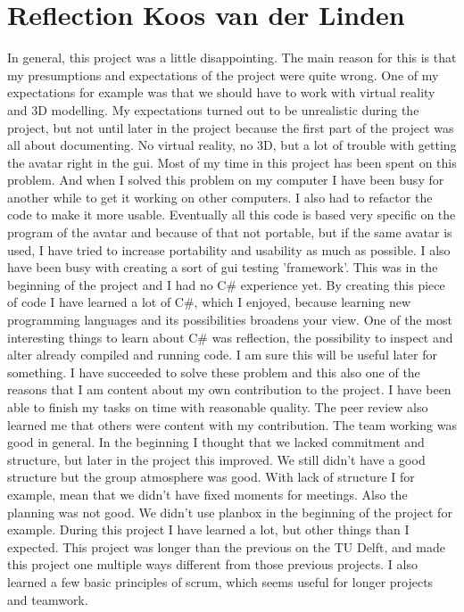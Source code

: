 \section{Reflection Koos van der Linden}
In general, this project was a little disappointing. The main reason for this is that my presumptions and expectations of the project were quite wrong. One of my expectations for example was that we should have to work with virtual reality and 3D modelling. My expectations turned out to be unrealistic during the project, but not until later in the project because the first part of the project was all about documenting. 
No virtual reality, no 3D, but a lot of trouble with getting the avatar right in the gui. Most of my time in this project has been spent on this problem. And when I solved this problem on my computer I have been busy for another while to get it working on other computers. I also had to refactor the code to make it more usable. Eventually all this code is based very specific on the program of the avatar and because of that not portable, but if the same avatar is used, I have tried to increase portability and usability as much as possible.
I also have been busy with creating a sort of gui testing 'framework'. This was in the beginning of the project and I had no C\# experience yet. By creating this piece of code I have learned a lot of C\#, which I enjoyed, because learning new programming languages and its possibilities broadens your view. One of the most interesting things to learn about C\# was reflection, the possibility to inspect and alter already compiled and running code. I am sure this will be useful later for something.
I have succeeded to solve these problem and this also one of the reasons that I am content about my own contribution to the project. I have been able to finish my tasks on time with reasonable quality. The peer review also learned me that others were content with my contribution.
The team working was good in general. In the beginning I thought that we lacked commitment and structure, but later in the project this improved. We still didn't have a good structure but the group atmosphere was good. With lack of structure I for example, mean that we didn't have fixed moments for meetings. Also the planning was not good. We didn't use planbox in the beginning of the project for example.
During this project I have learned a lot, but other things than I expected. This project was longer than the previous on the TU Delft, and made this project one multiple ways different from those previous projects. I also learned a few basic principles of scrum, which seems useful for longer projects and teamwork. 


